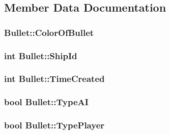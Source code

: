 \subsection{Member Data Documentation}
\hypertarget{classBullet_a9f3fc8ac1cfc3fe6fe154d4a7065b3bb}{
\subsubsection[{Color\-Of\-Bullet}]{ Bullet\-::\-Color\-Of\-Bullet\hspace{0.3cm}{\ttfamily [private]}}}\label{classBullet_a9f3fc8ac1cfc3fe6fe154d4a7065b3bb}
\hypertarget{classBullet_a1a70e1a43ad5f248ebc62214247d3c7b}{
\subsubsection[{Ship\-Id}]{\setlength{\rightskip}{0pt plus 5cm}int Bullet\-::\-Ship\-Id\hspace{0.3cm}{\ttfamily [private]}}}\label{classBullet_a1a70e1a43ad5f248ebc62214247d3c7b}
\hypertarget{classBullet_ab5cc1b11c455b72423ba9a91962dab6b}{
\subsubsection[{Time\-Created}]{\setlength{\rightskip}{0pt plus 5cm}int Bullet\-::\-Time\-Created\hspace{0.3cm}{\ttfamily [private]}}}\label{classBullet_ab5cc1b11c455b72423ba9a91962dab6b}
\hypertarget{classBullet_ae2f8ea9d3c700fc27efafec7d540404a}{
\subsubsection[{Type\-A\-I}]{\setlength{\rightskip}{0pt plus 5cm}bool Bullet\-::\-Type\-A\-I\hspace{0.3cm}{\ttfamily [private]}}}\label{classBullet_ae2f8ea9d3c700fc27efafec7d540404a}
\hypertarget{classBullet_ac1315818abe9b9c337af21b14c282868}{
\subsubsection[{Type\-Player}]{\setlength{\rightskip}{0pt plus 5cm}bool Bullet\-::\-Type\-Player\hspace{0.3cm}{\ttfamily [private]}}}\label{classBullet_ac1315818abe9b9c337af21b14c282868}
